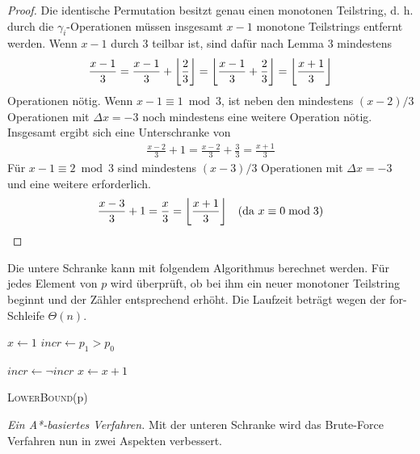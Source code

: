 \documentclass[a4paper, 11pt, ngerman]{article}
\begin{document}
\begin{proof}
    Die identische Permutation besitzt genau einen monotonen Teilstring, d. h. durch die $\gamma_i$-Operationen müssen insgesamt $x - 1$ monotone Teilstrings entfernt werden. Wenn $x - 1$ durch 3 teilbar ist, sind dafür nach Lemma 3 mindestens
    \begin{align*}
        \frac {x - 1} 3 = \frac {x - 1} 3 + \bigg{\lfloor} \frac 2 3 \bigg{\rfloor}
        = \bigg{\lfloor} \frac {x - 1} 3 + \frac 2 3 \bigg{\rfloor} =
        \bigg{\lfloor} \frac {x + 1} 3 \bigg{\rfloor}
    \end{align*}
    Operationen nötig. Wenn $x - 1 \equiv 1 \bmod 3$, ist neben den mindestens $(x - 2)/3$ Operationen mit $\Delta x = -3$ noch mindestens eine weitere Operation nötig. Insgesamt ergibt sich eine Unterschranke von
    \begin{align*}
        \frac {x - 2} 3 + 1 = \frac {x - 2} 3 + \frac 3 3 = \frac {x + 1} 3
    \end{align*}
    Für $x - 1 \equiv 2 \bmod 3$ sind mindestens $(x - 3) / 3$ Operationen mit $\Delta x = -3$ und eine weitere erforderlich.
    \begin{align*}
        \frac {x - 3} 3 + 1 = \frac x 3 = \bigg{\lfloor} \frac {x + 1} 3 \bigg{\rfloor} \quad (\text{da } x \equiv 0 \bmod 3)
    \end{align*}
\end{proof}

\noindent Die untere Schranke kann mit folgendem Algorithmus berechnet werden. Für jedes Element von $p$ wird überprüft, ob bei ihm ein neuer monotoner Teilstring beginnt und der Zähler entsprechend erhöht. Die Laufzeit beträgt wegen der for-Schleife $\Theta(n)$.

\begin{algorithm}
    {
         \;
    }

    $x \gets 1$ \;
    $incr \gets p_1 > p_0$ \;

    {
        {
            $incr \gets \neg incr$ \;
            $x \gets x + 1$ \;
        }
    }

     \;

    \caption{\textsc{LowerBound}(p)}
\end{algorithm}

\noindent \emph{Ein A*-basiertes Verfahren.} Mit der unteren Schranke wird das Brute-Force Verfahren nun in zwei Aspekten verbessert.
\end{document}
